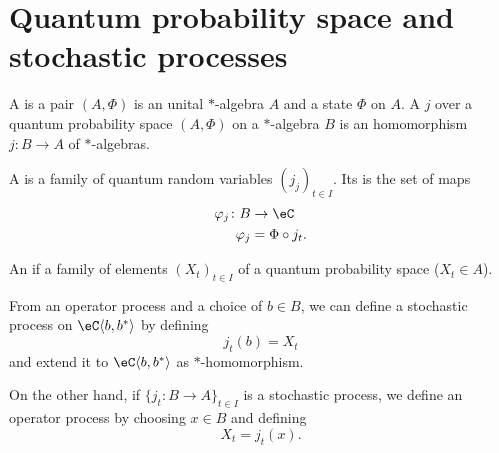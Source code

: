 \section{Quantum probability space and stochastic processes}

\begin{definition}
	A  is a pair $(A,\Phi)$ is an unital $*$-algebra $A$ and a state $\Phi$ on $A$. A  $j$ over a quantum probability space $(A,\Phi)$ on a $*$-algebra $B$ is an homomorphism $j\colon B\to A$ of $*$-algebras.
\end{definition}

\begin{definition}
	A  is a family of quantum random variables $(j_j)_{t\in I}$. Its  is the set of maps
	\begin{equation}
		\begin{aligned}
			\varphi_j\colon B & \to \eC         \\
			\varphi_j         & =\Phi\circ j_t.
		\end{aligned}
	\end{equation}
\end{definition}

\begin{definition}
	An  if a family of elements $(X_t)_{t\in I}$ of a quantum probability space ($X_t\in A$).
\end{definition}

From an operator process and a choice of $b\in B$, we can define a stochastic process on $\eC\langle b,b^*\rangle$ by defining
\begin{equation}
	j_t(b)=X_t
\end{equation}
and extend it to $\eC\langle b,b^*\rangle$ as $*$-homomorphism.

On the other hand, if $\{ j_t\colon B\to A \}_{t\in I}$ is a stochastic process, we define an operator process by choosing $x\in B$ and defining
\begin{equation}
	X_t=j_t(x).
\end{equation}

